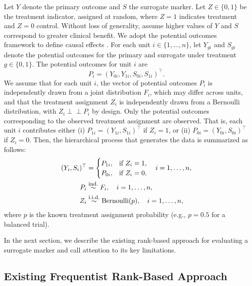 \documentclass[12pt]{article}
\newcommand{\iid}{\overset{\text{\footnotesize i.i.d.}}{\sim}}
\newcommand{\indep}{\perp \!\!\! \perp}
\begin{document}
Let \(Y\) denote the primary outcome and \(S\) the surrogate marker. Let \(Z \in \{0,1\}\) be the treatment indicator, assigned at random, where \(Z=1\) indicates treatment and \(Z=0\) control. Without loss of generality, assume higher values of \(Y\) and \(S\) correspond to greater clinical benefit. We adopt the potential outcomes framework to define causal effects \citep{rubin1974estimating}. For each unit \(i \in \{1,\ldots,n\}\), let \(Y_{gi}\) and \(S_{gi}\) denote the potential outcomes for the primary and surrogate under treatment \(g \in \{0,1\}\). The potential outcomes for unit \(i\) are
\[
  P_{i} = (Y_{0i}, Y_{1i}, S_{0i}, S_{1i})^{\top}.
\]
We assume that for each unit \(i\), the vector of potential outcomes \(P_i\) is independently drawn from a joint distribution \(F_i\), which may differ across units, and that the treatment assignment \(Z_i\) is independently drawn from a Bernoulli distribution, with \(Z_i \indep P_i\) by design. Only the potential outcomes corresponding to the observed treatment assignment are observed. That is, each unit \(i\) contributes either (i) \( P_{1i} = (Y_{1i}, S_{1i})^{\top}\) if \(Z_{i} = 1\), or (ii) \( P_{0i} = (Y_{0i}, S_{0i})^{\top}\) if \(Z_{i} = 0\). Then, the hierarchical process that generates the data is summarized as follows:
\begin{equation}
  \label{eq:data_generating_process}
  \begin{aligned}
    (Y_{i}, S_{i})^{\top} &=
    \begin{cases}
      P_{1i}, & \text{if } Z_{i} = 1, \\
      P_{0i}, & \text{if } Z_{i} = 0,
    \end{cases} \quad i = 1, \ldots, n, \\
    P_i &\overset{\text{\footnotesize ind.}}{\sim} F_i, \quad i = 1, \ldots, n, \\
    Z_{i} &\iid \text{Bernoulli}(p), \quad i = 1, \ldots, n,
  \end{aligned}
\end{equation}
where \(p\) is the known treatment assignment probability (e.g., \(p = 0.5\) for a balanced trial).

In the next section, we describe the existing rank-based approach for evaluating a surrogate marker and call attention to its key limitations.

\subsection{Existing Frequentist Rank-Based Approach}\label{subsec:frequentist_approach}
\end{document}
